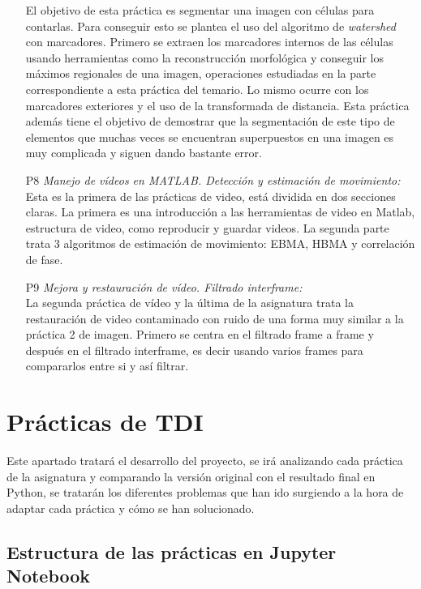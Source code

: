 \documentclass[a4paper,12pt]{report}
\begin{document}
\begin{itemize}
	El objetivo de esta práctica es segmentar una imagen con células para contarlas. Para conseguir esto se plantea el uso del algoritmo de \emph{watershed} con marcadores. Primero se extraen los marcadores internos de las células usando herramientas como la reconstrucción morfológica y conseguir los máximos regionales de una imagen, operaciones estudiadas en la parte correspondiente a esta práctica del temario. Lo mismo ocurre con los marcadores exteriores y el uso de la transformada de distancia. Esta práctica además tiene el objetivo de demostrar que la segmentación de este tipo de elementos que muchas veces se encuentran superpuestos en una imagen es muy complicada y siguen dando bastante error.
  \item [P8]\emph{Manejo de vídeos en MATLAB. Detección y estimación de movimiento:}\\
	Esta es la primera de las prácticas de video, está dividida en dos secciones claras. La primera es una introducción a las herramientas de video en Matlab, estructura de video, como reproducir y guardar videos. La segunda parte trata 3 algoritmos de estimación de movimiento: EBMA, HBMA y correlación de fase.
  \item [P9]\emph{Mejora y restauración de vídeo. Filtrado interframe:}\\
	La segunda práctica de vídeo y la última de la asignatura trata la restauración de video contaminado con ruido de una forma muy similar a la práctica 2 de imagen. Primero se centra en el filtrado frame a frame y después en el filtrado interframe, es decir usando varios frames para compararlos entre si y así filtrar.
\end{itemize}

\chapter{Prácticas de TDI}

Este apartado tratará el desarrollo del proyecto, se irá analizando cada práctica de la asignatura y comparando la versión original con el resultado final en Python, se tratarán los diferentes problemas que han ido surgiendo a la hora de adaptar cada práctica y cómo se han solucionado.\\

\section{Estructura de las prácticas en Jupyter Notebook}
\end{document}
